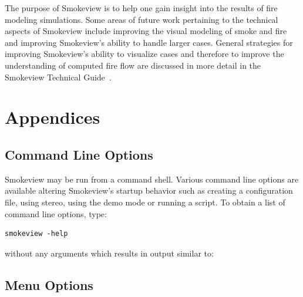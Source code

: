 \documentclass[11pt,twoside]{book}
\begin{document}
The purpose of Smokeview is to help one gain insight into the results
of fire modeling simulations.
Some areas of future work pertaining to the technical aspects of Smokeview include improving the visual modeling of smoke and fire and improving Smokeview's ability to handle larger cases.
General strategies for improving Smokeview's ability to visualize cases and therefore to improve the understanding of computed fire flow are discussed in more detail in the Smokeview Technical Guide~\cite{Smokeview_Tech_Guide}.






\part{Appendices}
\appendix
{}


\chapter{Command Line Options}
\label{sectioncommand} Smokeview may be run from a command shell.
Various command line options are available altering Smokeview's
startup behavior such as creating a configuration file, using
stereo, using the demo mode or running a script. To obtain a list
of command line options, type:
\begin{lstlisting}
smokeview -help
\end{lstlisting}
\noindent without any arguments which results in output similar to:\\




\chapter{Menu Options}
\label{sectionmenu}
\end{document}

